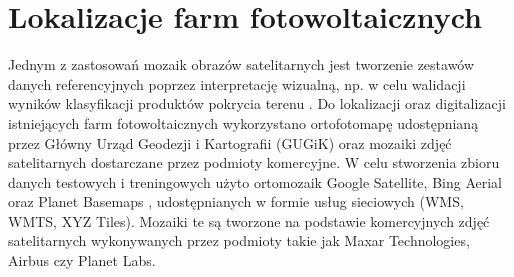 \documentclass{amuthesis}
\begin{document}
\hypertarget{sec-pv}{%
\section{Lokalizacje farm fotowoltaicznych}\label{sec-pv}}

Jednym z zastosowań mozaik obrazów satelitarnych jest tworzenie zestawów
danych referencyjnych poprzez interpretację wizualną, np. w celu
walidacji wyników klasyfikacji produktów pokrycia terenu
\autocite{lesiv_2018_sat_imagery_mosaics}. Do lokalizacji oraz
digitalizacji istniejących farm fotowoltaicznych wykorzystano
ortofotomapę udostępnianą przez Główny Urząd Geodezji i Kartografii
(GUGiK) oraz mozaiki zdjęć satelitarnych dostarczane przez podmioty
komercyjne. W celu stworzenia zbioru danych testowych i treningowych
użyto ortomozaik Google Satellite, Bing Aerial oraz Planet Basemaps
\autocite{planet}, udostępnianych w formie usług sieciowych (WMS, WMTS,
XYZ Tiles). Mozaiki te są tworzone na podstawie komercyjnych zdjęć
satelitarnych wykonywanych przez podmioty takie jak Maxar Technologies,
Airbus czy Planet Labs.
\end{document}
